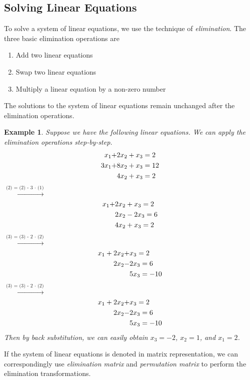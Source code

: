 \documentclass{article}
\newtheorem{example}{Example}[section]
\begin{document}
\subsection{Solving Linear Equations}
To solve a system of linear equations, we use the technique of \textit{elimination}. The three basic elimination operations are
\begin{enumerate}
    \item Add two linear equations
    \item Swap two linear equations
    \item Multiply a linear equation by a non-zero number
\end{enumerate}
The solutions to the system of linear equations remain unchanged after the elimination operations.

\begin{example}
    Suppose we have the following linear equations. We can apply the elimination operations step-by-step. 
    \begin{align}
        x_1 + & 2x_2 + x_3 = 2 \\ \notag
        3x_1 + & 8x_2 + x_3 = 12 \\ \notag
        & 4x_2 + x_3 = 2 \notag
    \end{align}
    $\xrightarrow{\text{(2) = (2) - 3 $\cdot$ (1)}}$
    \begin{align}
        x_1 + & 2x_2 + x_3 = 2 \\ \notag
        & 2x_2 - 2x_3 = 6 \\ \notag
        & 4x_2 + x_3 = 2
    \end{align}
    $\xrightarrow{\text{(3) = (3) - 2 $\cdot$ (2)}}$
    \begin{align}
        x_1 + 2x_2 + & x_3 = 2 \\ \notag
        2x_2 - & 2x_3 = 6 \\ \notag
        & 5x_3 = -10
    \end{align}
    $\xrightarrow{\text{(3) = (3) - 2 $\cdot$ (2)}}$
    \begin{align}
        x_1 + 2x_2 + & x_3 = 2 \\ \notag
        2x_2 - & 2x_3 = 6 \\ \notag
        & 5x_3 = -10
    \end{align}
    Then by back substitution, we can easily obtain $x_3=-2$, $x_2=1$, and $x_1=2$.
\end{example}


If the system of linear equations is denoted in matrix representation, we can correspondingly use \textit{elimination matrix} and \textit{permutation matrix} to perform the elimination transformations.
\end{document}
